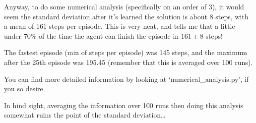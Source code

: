 \documentclass{article}
\begin{document}
\begin{enumerate}
    Anyway, to do some numerical analysis (specifically on an order of 3), it would seem the standard deviation after
    it's learned the solution is about 8 steps, with a mean of 161 steps per episode. This is very neat, and tells me that 
    a little under 70\% of the time the agent can finish the episode in $ 161 \pm 8 $ steps!

    The fastest episode (min of steps per episode) was 145 steps, and the maximum after the 25th episode was 195.45 (remember that
    this is averaged over 100 runs). 

    You can find more detailed information by looking at `numerical\_analysis.py', if you so desire. 

    In hind sight, averaging the information over 100 runs then doing this analysis somewhat ruins the point of the standard deviation\dots

\newpage


\end{enumerate}
\end{document}
